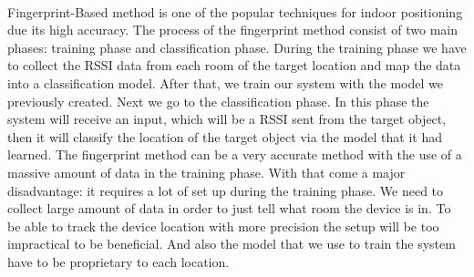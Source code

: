 \paragraph{}Fingerprint-Based method is one of the popular techniques for indoor positioning due its high accuracy. The process of the fingerprint method consist of two main phases: training phase and classification phase. During the training phase we have to collect the RSSI data from each room of the target location and map the data into a classification model. After that, we train our system with the model we previously created. Next we go to the classification phase. In this phase the system will receive an input, which will be a RSSI sent from the target object, then it will classify the location of the target object via the model that it had learned. The fingerprint method can be a very accurate method with the use of a massive amount of data in the training phase. With that come a major disadvantage: it requires a lot of set up during the training phase. We need to collect large amount of data in order to just tell what room the device is in. To be able to track the device location with more precision the setup will be too impractical to be beneficial. And also the model that we use to train the system have to be proprietary to each location.


